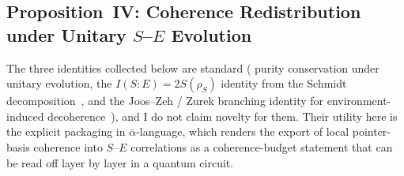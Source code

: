 
\subsection{\label{sec:prop4}Proposition~IV:
            Coherence Redistribution under Unitary $S$--$E$ Evolution}

The three identities collected below are standard ( purity
conservation under unitary evolution, the
$I(S{:}E) = 2S(\rho_S)$ identity from the Schmidt
decomposition~\cite{NielsenChuang2000}, and the Joos--Zeh / Zurek
branching identity for environment-induced
decoherence~\cite{JoosZeh1985,Zurek2003}), and I do not claim
novelty for them.
Their utility here is the explicit packaging in $\bar\alpha$-language,
which renders the export of local pointer-basis coherence into
$S$--$E$ correlations as a coherence-budget statement that can be
read off layer by layer in a quantum circuit.

